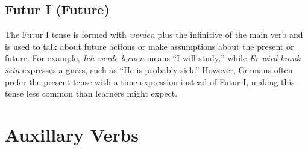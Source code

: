 \documentclass[10pt,a4paper]{revtex4-2}
\begin{document}
\subsection{Futur I (Future)}
The Futur I tense is formed with \textit{werden} plus the infinitive of the main verb and is used to talk about future actions or make assumptions about the present or future. For example, \textit{Ich werde lernen} means “I will study,” while \textit{Er wird krank sein} expresses a guess, such as “He is probably sick.” However, Germans often prefer the present tense with a time expression instead of Futur I, making this tense less common than learners might expect.

\newpage

\section{Auxillary Verbs}
\end{document}
